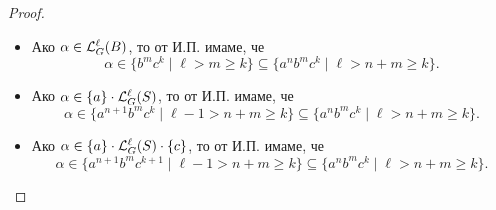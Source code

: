 \begin{proof}
\begin{itemize}
    \begin{itemize}
    \item
      Ако $\alpha \in \mathcal{L}^\ell_G(B)$, то от И.П. имаме, че
      \[\alpha \in \{b^mc^k \mid \ell > m \geq k\} \subseteq \{a^nb^mc^k \mid \ell > n+m \geq k\}.\]
    \item
      Ако $\alpha \in \{a\} \cdot \mathcal{L}^{\ell}_G(S)$, то от И.П. имаме, че
      \[\alpha \in \{a^{n+1}b^mc^k \mid \ell - 1 > n+m \geq k\} \subseteq \{a^nb^mc^k \mid \ell > n+m \geq k\}.\]
    \item
      Ако $\alpha \in \{a\} \cdot \mathcal{L}^{\ell}_G(S) \cdot \{c\}$, то от И.П. имаме, че
      \[\alpha \in \{a^{n+1}b^mc^{k+1} \mid \ell - 1 > n+m \geq k\} \subseteq \{a^nb^mc^k \mid \ell > n+m \geq k\}.\]
    \end{itemize}
  \end{itemize}


\end{proof}
